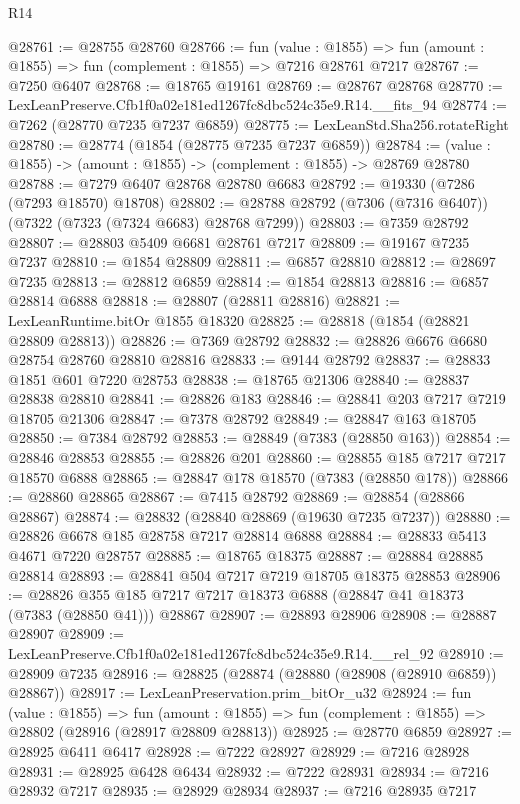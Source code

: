 \begin{lexlean}{R14}
\begin{coremodule}
@28761 := @28755 @28760
@28766 := fun (value : @1855) =>
  fun (amount : @1855) => fun (complement : @1855) => @7216 @28761 @7217
@28767 := @7250 @6407
@28768 := @18765 @19161
@28769 := @28767 @28768
@28770 := LexLeanPreserve.Cfb1f0a02e181ed1267fc8dbc524c35e9.R14.__fits_94
@28774 := @7262 (@28770 @7235 @7237 @6859)
@28775 := LexLeanStd.Sha256.rotateRight
@28780 := @28774 (@1854 (@28775 @7235 @7237 @6859))
@28784 := (value : @1855) -> (amount : @1855) -> (complement : @1855) -> @28769 @28780
@28788 := @7279 @6407 @28768 @28780 @6683
@28792 := @19330 (@7286 (@7293 @18570) @18708)
@28802 := @28788 @28792 (@7306 (@7316 @6407)) (@7322 (@7323 (@7324 @6683) @28768 @7299))
@28803 := @7359 @28792
@28807 := @28803 @5409 @6681 @28761 @7217
@28809 := @19167 @7235 @7237
@28810 := @1854 @28809
@28811 := @6857 @28810
@28812 := @28697 @7235
@28813 := @28812 @6859
@28814 := @1854 @28813
@28816 := @6857 @28814 @6888
@28818 := @28807 (@28811 @28816)
@28821 := LexLeanRuntime.bitOr @1855 @18320
@28825 := @28818 (@1854 (@28821 @28809 @28813))
@28826 := @7369 @28792
@28832 := @28826 @6676 @6680 @28754 @28760 @28810 @28816
@28833 := @9144 @28792
@28837 := @28833 @1851 @601 @7220 @28753
@28838 := @18765 @21306
@28840 := @28837 @28838 @28810
@28841 := @28826 @183
@28846 := @28841 @203 @7217 @7219 @18705 @21306
@28847 := @7378 @28792
@28849 := @28847 @163 @18705
@28850 := @7384 @28792
@28853 := @28849 (@7383 (@28850 @163))
@28854 := @28846 @28853
@28855 := @28826 @201
@28860 := @28855 @185 @7217 @7217 @18570 @6888
@28865 := @28847 @178 @18570 (@7383 (@28850 @178))
@28866 := @28860 @28865
@28867 := @7415 @28792
@28869 := @28854 (@28866 @28867)
@28874 := @28832 (@28840 @28869 (@19630 @7235 @7237))
@28880 := @28826 @6678 @185 @28758 @7217 @28814 @6888
@28884 := @28833 @5413 @4671 @7220 @28757
@28885 := @18765 @18375
@28887 := @28884 @28885 @28814
@28893 := @28841 @504 @7217 @7219 @18705 @18375 @28853
@28906 := @28826 @355 @185 @7217 @7217 @18373 @6888 (@28847 @41 @18373 (@7383 (@28850 @41))) @28867
@28907 := @28893 @28906
@28908 := @28887 @28907
@28909 := LexLeanPreserve.Cfb1f0a02e181ed1267fc8dbc524c35e9.R14.__rel_92
@28910 := @28909 @7235
@28916 := @28825 (@28874 (@28880 (@28908 (@28910 @6859)) @28867))
@28917 := LexLeanPreservation.prim_bitOr_u32
@28924 := fun (value : @1855) =>
  fun (amount : @1855) => fun (complement : @1855) => @28802 (@28916 (@28917 @28809 @28813))
@28925 := @28770 @6859
@28927 := @28925 @6411 @6417
@28928 := @7222 @28927
@28929 := @7216 @28928
@28931 := @28925 @6428 @6434
@28932 := @7222 @28931
@28934 := @7216 @28932 @7217
@28935 := @28929 @28934
@28937 := @7216 @28935 @7217

\end{coremodule}
\end{lexlean}
